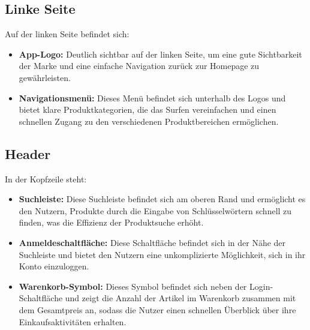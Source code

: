  \subsection{Linke Seite}
 
Auf der linken Seite befindet sich:
\begin{itemize}
	\item \textbf{App-Logo:} Deutlich sichtbar auf der linken Seite, um eine gute Sichtbarkeit der Marke und eine einfache Navigation zurück zur Homepage zu gewährleisten.
	\item \textbf{Navigationsmenü:} Dieses Menü befindet sich unterhalb des Logos und bietet klare Produktkategorien, die das Surfen vereinfachen und einen schnellen Zugang zu den verschiedenen Produktbereichen ermöglichen.
\end{itemize}

 \subsection{Header}
 
In der Kopfzeile steht:
\begin{itemize}
	\item \textbf{Suchleiste:} Diese Suchleiste befindet sich am oberen Rand und ermöglicht es den Nutzern, Produkte durch die Eingabe von Schlüsselwörtern schnell zu finden, was die Effizienz der Produktsuche erhöht.
	\item \textbf{Anmeldeschaltfläche:} Diese Schaltfläche befindet sich in der Nähe der Suchleiste und bietet den Nutzern eine unkomplizierte Möglichkeit, sich in ihr Konto einzuloggen.
	\item \textbf{Warenkorb-Symbol:} Dieses Symbol befindet sich neben der Login-Schaltfläche und zeigt die Anzahl der Artikel im Warenkorb zusammen mit dem Gesamtpreis an, sodass die Nutzer einen schnellen Überblick über ihre Einkaufsaktivitäten erhalten.
\end{itemize}


